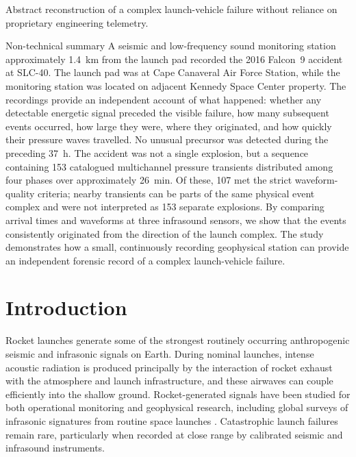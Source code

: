 \documentclass[]{seismica}
\begin{document}
{\begin{summary}{Abstract}
  reconstruction of a complex launch-vehicle failure without reliance on
  proprietary engineering telemetry.
  \end{summary}
  \begin{summary}{Non-technical summary}
  A seismic and low-frequency sound monitoring station approximately
  \SI{1.4}{\kilo\metre} from the launch pad recorded the 2016 Falcon~9
  accident at SLC-40. The launch pad was at Cape Canaveral Air Force Station,
  while the monitoring station was located on adjacent Kennedy Space Center
  property. The recordings provide an independent account of what happened:
  whether any detectable energetic signal preceded the visible failure, how
  many subsequent events occurred, how large they were, where they originated,
  and how quickly their pressure waves travelled. No unusual precursor was
  detected during the preceding \SI{37}{\hour}. The accident was not a single
  explosion, but a sequence containing 153 catalogued multichannel pressure
  transients distributed among four phases over approximately
  \SI{26}{\minute}. Of these, 107 met the strict waveform-quality criteria;
  nearby transients can be parts of the same physical event complex and were
  not interpreted as 153 separate explosions. By comparing arrival times and waveforms at
  three infrasound sensors, we show that the events consistently originated
  from the direction of the launch complex. The study demonstrates how a
  small, continuously recording geophysical station can provide an independent
  forensic record of a complex launch-vehicle failure.
  \end{summary}
}


\section{Introduction}
\label{sec:introduction}

Rocket launches generate some of the strongest routinely occurring
anthropogenic seismic and infrasonic signals on Earth. During nominal launches,
intense acoustic radiation is produced principally by the interaction of rocket
exhaust with the atmosphere and launch infrastructure, and these airwaves can
couple efficiently into the shallow ground. Rocket-generated signals have been
studied for both operational monitoring and geophysical research, including
global surveys of infrasonic signatures from routine space launches
\citep{pilger_rocket_2021}. Catastrophic launch failures remain rare,
particularly when recorded at close range by calibrated seismic and infrasound
instruments.
\end{document}
